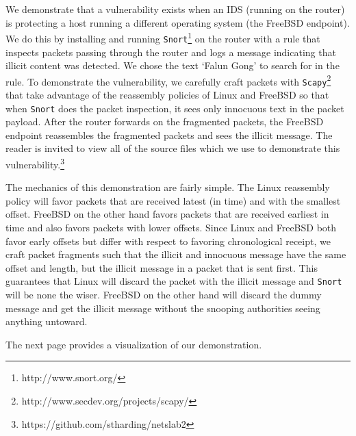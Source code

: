 \documentclass[]{article}
\begin{document}
We demonstrate that a vulnerability exists when an IDS (running on the router) is
protecting a host running a different operating system (the FreeBSD endpoint). We
do this by installing and running \texttt{Snort}\footnote{http://www.snort.org/}
on the router with a rule that inspects packets passing through the router and logs
a message indicating that illicit content was detected. We chose the text `Falun Gong'
to search for in the rule. To demonstrate the vulnerability, we carefully craft packets 
with \texttt{Scapy}\footnote{http://www.secdev.org/projects/scapy/} that take advantage
of the reassembly policies of Linux and FreeBSD so that when \texttt{Snort} does the 
packet inspection, it sees only innocuous text in the packet payload. After the router 
forwards on the fragmented packets, the FreeBSD endpoint reassembles the fragmented 
packets and sees the illicit message. The reader is invited to view all of the source 
files which we use to demonstrate this 
vulnerability.\footnote{https://github.com/stharding/netslab2}

The mechanics of this demonstration are fairly simple. The Linux reassembly policy
will favor packets that are received latest (in time) and with the smallest offset.
FreeBSD on the other hand favors packets that are received earliest in time and also
favors packets with lower offsets. Since Linux and FreeBSD both favor early offsets
but differ with respect to favoring chronological receipt, we craft packet fragments
such that the illicit and innocuous message have the same offset and length, but the
illicit message in a packet that is sent first. This guarantees that Linux will discard
the packet with the illicit message and \texttt{Snort} will be none the wiser. FreeBSD on
the other hand will discard the dummy message and get the illicit message without the
snooping authorities seeing anything untoward.

The next page provides a visualization of our demonstration.
\end{document}
